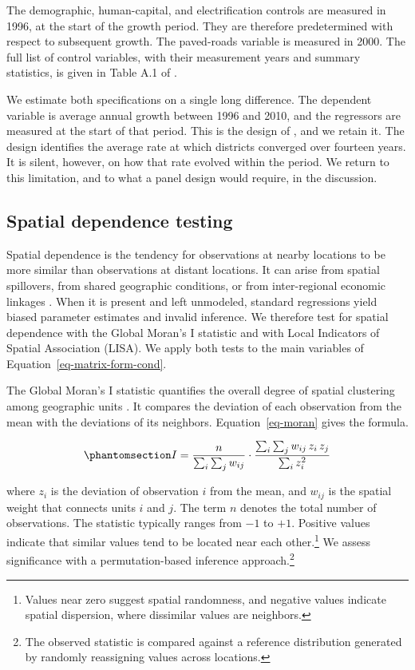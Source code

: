 \documentclass[
  a4paper, 
  twoside,
  final
]{article}
\begin{document}
The demographic, human-capital, and electrification controls are
measured in 1996, at the start of the growth period. They are therefore
predetermined with respect to subsequent growth. The paved-roads
variable is measured in 2000. The full list of control variables, with
their measurement years and summary statistics, is given in Table A.1 of
\citet{chanda_kabiraj_district_convergence}.

We estimate both specifications on a single long difference. The
dependent variable is average annual growth between 1996 and 2010, and
the regressors are measured at the start of that period. This is the
design of \citet{chanda_kabiraj_district_convergence}, and we retain it.
The design identifies the average rate at which districts converged over
fourteen years. It is silent, however, on how that rate evolved within
the period. We return to this limitation, and to what a panel design
would require, in the discussion.

\subsection{Spatial dependence
testing}\label{spatial-dependence-testing}

Spatial dependence is the tendency for observations at nearby locations
to be more similar than observations at distant locations. It can arise
from spatial spillovers, from shared geographic conditions, or from
inter-regional economic linkages \citep{anselin_spatial_analysis}. When
it is present and left unmodeled, standard regressions yield biased
parameter estimates and invalid inference. We therefore test for spatial
dependence with the Global Moran's I statistic and with Local Indicators
of Spatial Association (LISA). We apply both tests to the main variables
of Equation~\ref{eq-matrix-form-cond}.

The Global Moran's I statistic quantifies the overall degree of spatial
clustering among geographic units \citep{moran_spatial_autocorrelation}.
It compares the deviation of each observation from the mean with the
deviations of its neighbors. Equation~\ref{eq-moran} gives the formula.

\begin{equation}\phantomsection\label{eq-moran}{
I=\frac{n}{\sum_i \sum_j w_{ij}} \cdot \frac{\sum_i \sum_j w_{ij} \, z_i \, z_j}{\sum_i z_i^2}
}\end{equation}

where \(z_i\) is the deviation of observation \(i\) from the mean, and
\(w_{ij}\) is the spatial weight that connects units \(i\) and \(j\).
The term \(n\) denotes the total number of observations. The statistic
typically ranges from \(-1\) to \(+1\). Positive values indicate that
similar values tend to be located near each other.\footnote{Values near
  zero suggest spatial randomness, and negative values indicate spatial
  dispersion, where dissimilar values are neighbors.} We assess
significance with a permutation-based inference approach.\footnote{The
  observed statistic is compared against a reference distribution
  generated by randomly reassigning values across locations.}
\end{document}
